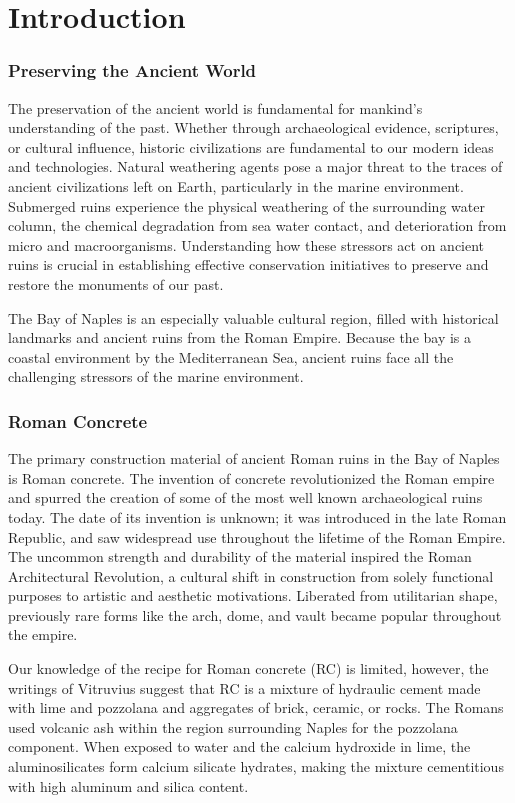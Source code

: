 \documentclass[12pt]{article}
\begin{document}
\onehalfspace
\twocolumn

\section*{Introduction}
\subsubsection*{Preserving the Ancient World}
The preservation of the ancient world is fundamental for mankind’s understanding of the past. Whether through archaeological evidence, scriptures, or cultural influence, historic civilizations are fundamental to our modern ideas and technologies. Natural weathering agents pose a major threat to the traces of ancient civilizations left on Earth, particularly in the marine environment. Submerged ruins experience the physical weathering of the surrounding water column, the chemical degradation from sea water contact, and deterioration from micro and macroorganisms. Understanding how these stressors act on ancient ruins is crucial in establishing effective conservation initiatives to preserve and restore the monuments of our past.

The Bay of Naples is an especially valuable cultural region, filled with historical landmarks and ancient ruins from the Roman Empire. Because the bay is a coastal environment by the Mediterranean Sea, ancient ruins face all the challenging stressors of the marine environment. 

\subsubsection*{Roman Concrete}

The primary construction material of ancient Roman ruins in the Bay of Naples is Roman concrete. The invention of concrete revolutionized the Roman empire and spurred the creation of some of the most well known archaeological ruins today. The date of its invention is unknown; it was introduced in the late Roman Republic, and saw widespread use throughout the lifetime of the Roman Empire. The uncommon strength and durability of the material inspired the Roman Architectural Revolution, a cultural shift in construction from solely functional purposes to artistic and aesthetic motivations. Liberated from utilitarian shape, previously rare forms like the arch, dome, and vault became popular throughout the empire.

Our knowledge of the recipe for Roman concrete (RC) is limited, however, the writings of Vitruvius suggest that RC is a mixture of hydraulic cement made with lime and pozzolana and aggregates of brick, ceramic, or rocks. The Romans used volcanic ash within the region surrounding Naples for the pozzolana component. When exposed to water and the calcium hydroxide in lime, the aluminosilicates form calcium silicate hydrates, making the mixture cementitious with high aluminum and silica content.
\end{document}
